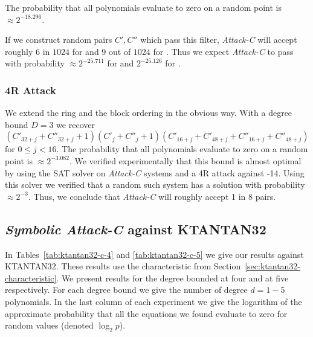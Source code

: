 The probability that all polynomials evaluate to zero on a random point is $\approx 2^{-18.296}$.

If we construct random pairs $C',C''$ which pass this filter, \emph{Attack-C} will accept roughly $6$ in $1024$ for  and $9$ out of $1024$ for . Thus we expect \emph{Attack-C} to pass with probability $\approx 2^{-25.711}$ for  and $2^{-25.126}$ for .

\subsubsection*{4R Attack}
We extend the ring and the block ordering in the obvious way. With a degree bound $D=3$ we recover $$(C'_{32+j} + C''_{32+j} + 1)(C'_{j} + C''_{j} + 1)(C'_{16+j} + C'_{48+j} + C''_{16+j} + C''_{48+j})$$ for $0 \leq j < 16$. The probability that all polynomials evaluate to zero on a random point is $\approx 2^{-3.082}$. We verified experimentally that this bound is almost optimal by using the SAT solver \CryptoMiniSat on \emph{Attack-C} systems and a 4R attack against -14. Using this solver we verified that a random such system has a solution with probability $\approx 2^{-3}$. Thus, we conclude that \emph{Attack-C} will roughly accept 1 in 8 pairs.

\subsection{\emph{Symbolic Attack-C} against KTANTAN32}
In Tables~\ref{tab:ktantan32-c-4} and \ref{tab:ktantan32-c-5} we give our results against KTANTAN32. These results use the characteristic from Section~\ref{sec:ktantan32-characteristic}. We present results for the degree bounded at four and at five respectively. For each degree bound we give the number of degree $d=1-5$ polynomials. In the last column of each experiment we give the logarithm of the approximate probability that all the equations we found evaluate to zero for random values (denoted $\log_2 p$).

